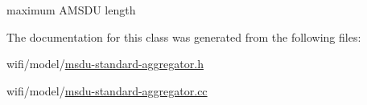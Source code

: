 maximum A\+M\+S\+DU length 



The documentation for this class was generated from the following files\+:\begin{DoxyCompactItemize}
\item 
wifi/model/\hyperlink{msdu-standard-aggregator_8h}{msdu-\/standard-\/aggregator.\+h}\item 
wifi/model/\hyperlink{msdu-standard-aggregator_8cc}{msdu-\/standard-\/aggregator.\+cc}\end{DoxyCompactItemize}
